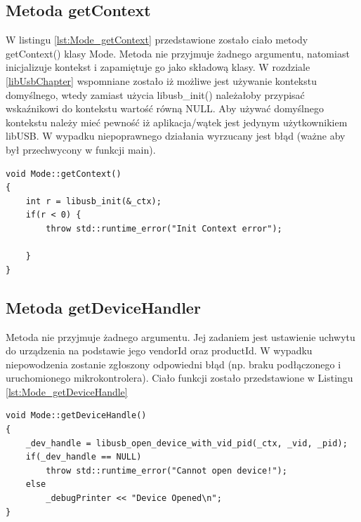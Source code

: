 \documentclass{BscUS}
\begin{document}
\subsection{Metoda getContext}
W listingu \ref{lst:Mode_getContext} przedstawione zostało ciało metody getContext() klasy Mode.
\newline
Metoda nie przyjmuje żadnego argumentu, natomiast inicjalizuje kontekst i zapamiętuje go jako składową klasy. W rozdziale \ref{libUsbChapter} wspomniane zostało iż możliwe jest używanie kontekstu domyślnego, wtedy zamiast użycia libusb\_init() należałoby przypisać wskaźnikowi do kontekstu wartość równą NULL. 
\newline
Aby używać domyślnego kontekstu należy mieć pewność iż aplikacja/wątek jest jedynym użytkownikiem libUSB.
\newline
W wypadku niepoprawnego działania wyrzucany jest błąd (ważne aby był przechwycony w funkcji main).
\begin{lstlisting}[caption={Metoda Mode::getContext()},label={lst:Mode_getContext}]
void Mode::getContext()
{	
	int r = libusb_init(&_ctx);
	if(r < 0) {
		throw std::runtime_error("Init Context error");

	}
}
\end{lstlisting}
\subsection{Metoda getDeviceHandler}
Metoda nie przyjmuje żadnego argumentu. Jej zadaniem jest ustawienie uchwytu do urządzenia na podstawie jego vendorId oraz productId. W wypadku niepowodzenia zostanie zgłoszony odpowiedni błąd (np. braku podłączonego i uruchomionego mikrokontrolera).
Ciało funkcji zostało przedstawione w Listingu \ref{lst:Mode_getDeviceHandle}
\begin{lstlisting}[caption={Metoda Mode::getDeviceHandler()},label={lst:Mode_getDeviceHandle}]
void Mode::getDeviceHandle()
{
	_dev_handle = libusb_open_device_with_vid_pid(_ctx, _vid, _pid);
	if(_dev_handle == NULL)
		throw std::runtime_error("Cannot open device!");
	else
		_debugPrinter << "Device Opened\n";
}
\end{lstlisting}
\end{document}
